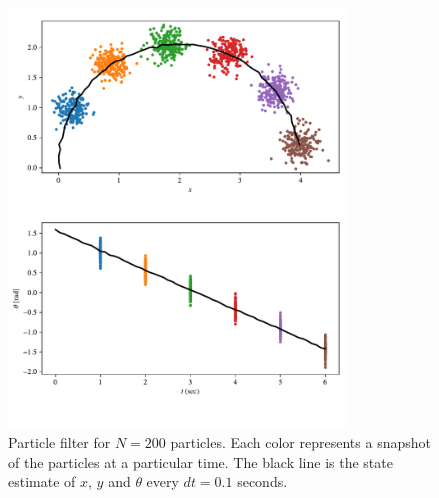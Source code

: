 \begin{figure}[h]
    \centering
    \includegraphics[width=0.8\textwidth]{q1_3.pdf}
    \vspace{-5mm}
    \caption{Particle filter for $N=200$ particles. Each color represents a snapshot of the particles at a particular time. The black line is the state estimate of $x$, $y$ and $\theta$ every $dt=0.1$ seconds.}
\end{figure}